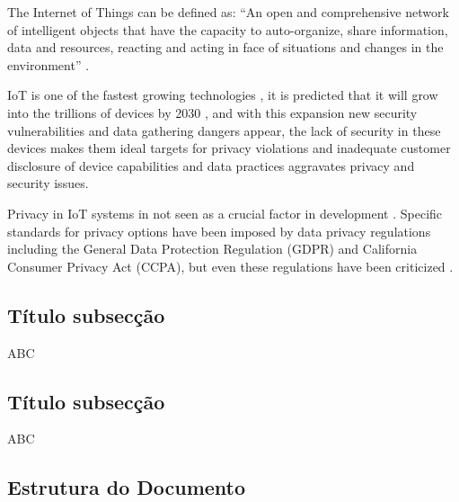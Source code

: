 
The Internet of Things can be defined as: ``An open and comprehensive network
of intelligent objects that have the capacity to auto-organize, share information,
data and resources, reacting and acting in face of situations and changes
in the environment'' \cite{madakam2015internet}.

IoT is one of the fastest growing technologies \cite{MohammadState}, it
is predicted that it will grow into the trillions of devices by 2030 \cite{SarawiInternet},
and with this expansion new security vulnerabilities and data gathering
dangers appear, the lack of security in these devices makes them ideal targets
for privacy violations and inadequate customer disclosure of device capabilities
and data practices aggravates privacy and security issues.

Privacy in IoT systems in not seen as a crucial factor in development \cite{alhirabi2021security}.
Specific standards for privacy options have been imposed by data privacy
regulations including the General Data Protection Regulation (GDPR) and
California Consumer Privacy Act (CCPA), but even these regulations have
been criticized \cite{peloquin2020disruptive, gladis2022weaponizing, gentile2022deficient, green2022flaws, byun2019privacy}.

\subsection{Título subsecção}

ABC

\subsection{Título subsecção}

ABC

\subsection{Estrutura do Documento}
